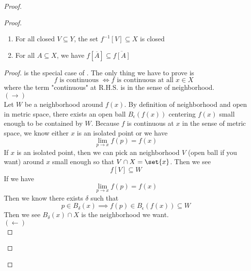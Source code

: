 \documentclass{report}
\begin{document}
\begin{proof}
\begin{proof}
\begin{theorem}
\begin{enumerate}[label=(\alph*)]
\item For all closed $V\subseteq Y$, the set $f^{-1}[V]\subseteq X$ is closed
\item For all $A\subseteq X$, we have $f[\overline{A}]\subseteq \overline{f[A]}$
\end{enumerate}
\end{theorem}
\begin{proof}
 is the special case of . The only thing we have to prove is 
\begin{equation*}
f\text{ is continuous }\iff  f\text{ is continuous at all $x\in X$ }
\end{equation*}
where the term "continuous" at R.H.S. is in the sense of neighborhood.\\

$(\longrightarrow)$\\

Let $W$ be a neighborhood around  $f(x)$. By definition of neighborhood and open in metric space, there exists  an open ball $B_{\epsilon }(f(x))$ centering $f(x)$ small enough to be contained by $W$. Because $f$ is continuous at  $x$ in the sense of metric space, we know either $x$ is an isolated point or we have 
\begin{equation*}
\lim_{p\to x}f(p)=f(x)
\end{equation*}
If $x$ is an isolated point, then we can pick an neighborhood $V$ (open ball if you want) around $x$  small enough so that $V\cap X=\set{x}$. Then we see 
\begin{equation*}
f[V]\subseteq W
\end{equation*}
If we have 
\begin{equation*}
\lim_{p\to x}f(p)=f(x)
\end{equation*}
Then we know there exists $\delta$ such that 
\begin{equation*}
p\in B_{\delta}(x)\implies f(p)\in B_{\epsilon }(f(x))\subseteq W
\end{equation*}
Then we see $B_{\delta}(x)\cap X$ is the neighborhood we want.\\

$(\longleftarrow)$\\


\end{proof}
\end{proof}
\end{proof}
\end{document}
